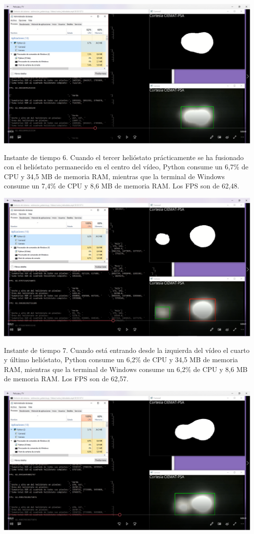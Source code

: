 \documentclass[12pt]{article}
\begin{document}
\includegraphics[width=\textwidth]{CapturasRendimientoSoftware1/Imagen6.png}

Instante de tiempo 6. Cuando el tercer helióstato prácticamente se ha fusionado con el helióstato permanecido en el centro del vídeo, Python consume un 6,7\% de CPU y 34,5 MB de memoria RAM, mientras que la terminal de Windows consume un 7,4\% de CPU y 8,6 MB de memoria RAM. Los FPS son de 62,48.


\includegraphics[width=\textwidth]{CapturasRendimientoSoftware1/Imagen7.png}

Instante de tiempo 7. Cuando está entrando desde la izquierda del vídeo el cuarto y último helióstato, Python consume un 6,2\% de CPU y 34,5 MB de memoria RAM, mientras que la terminal de Windows consume un 6,2\% de CPU y 8,6 MB de memoria RAM. Los FPS son de 62,57.


\includegraphics[width=\textwidth]{CapturasRendimientoSoftware1/Imagen8.png}
\end{document}
